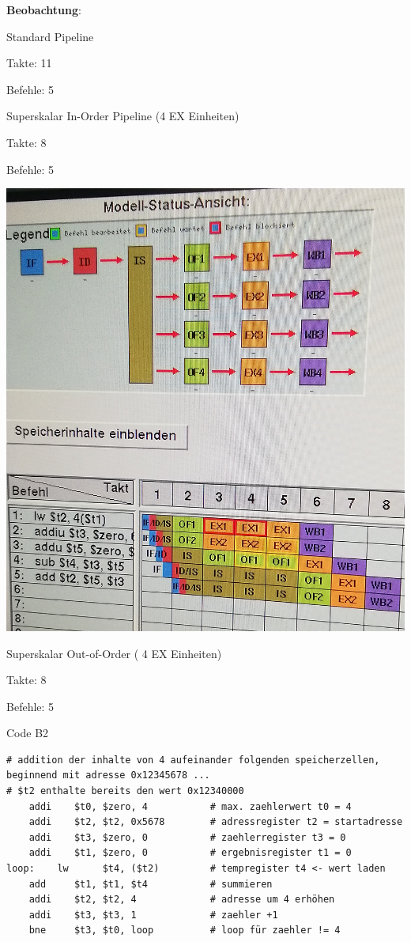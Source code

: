 \documentclass[a4paper,12pt,titlepage]{scrartcl}
\begin{document}
\textbf{Beobachtung}:
\begin{itemize*}
    \item Standard Pipeline
    \begin{itemize*}
        \item Takte: 11
        \item Befehle: 5
    \end{itemize*}
    \item Superskalar In-Order Pipeline (4 EX Einheiten)
    \begin{itemize*}
        \item Takte: 8
        \item Befehle: 5
        \item \includegraphics[width=.4\linewidth]{Assets/RA2-61330.jpg}
    \end{itemize*}
    \item Superskalar Out-of-Order ( 4 EX Einheiten)
    \begin{itemize*}
        \item Takte: 8
        \item Befehle: 5
    \end{itemize*}
\end{itemize*}

Code B2
\begin{lstlisting}[basicstyle=\tiny]
# addition der inhalte von 4 aufeinander folgenden speicherzellen, beginnend mit adresse 0x12345678 ...
# $t2 enthalte bereits den wert 0x12340000
    addi    $t0, $zero, 4           # max. zaehlerwert t0 = 4
    addi    $t2, $t2, 0x5678        # adressregister t2 = startadresse
    addi    $t3, $zero, 0           # zaehlerregister t3 = 0
    addi    $t1, $zero, 0           # ergebnisregister t1 = 0
loop:    lw      $t4, ($t2)         # tempregister t4 <- wert laden
    add     $t1, $t1, $t4           # summieren
    addi    $t2, $t2, 4             # adresse um 4 erhöhen
    addi    $t3, $t3, 1             # zaehler +1
    bne     $t3, $t0, loop          # loop für zaehler != 4
\end{lstlisting}
\end{document}
